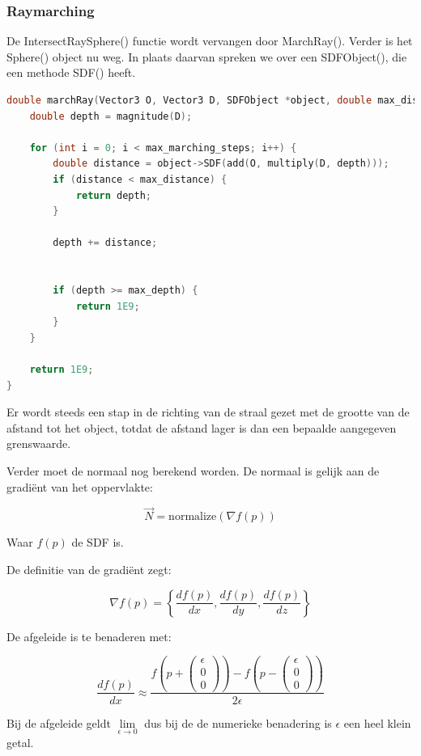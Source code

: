 \documentclass[12pt, a4paper]{article}
\newcommand*{\ora}{\overrightarrow}
\begin{document}
\subsubsection{Raymarching}

De IntersectRaySphere() functie wordt vervangen door MarchRay(). Verder is het Sphere() object nu weg. In plaats daarvan spreken we over een SDFObject(), die een methode SDF() heeft.

\begin{lstlisting}[language=C++]
double marchRay(Vector3 O, Vector3 D, SDFObject *object, double max_distance, int max_marching_steps, double max_depth) {
    double depth = magnitude(D);

    for (int i = 0; i < max_marching_steps; i++) {
        double distance = object->SDF(add(O, multiply(D, depth)));
        if (distance < max_distance) {
            return depth;
        }

        depth += distance;


        if (depth >= max_depth) {
            return 1E9;
        }
    }

    return 1E9;
}
\end{lstlisting}

Er wordt steeds een stap in de richting van de straal gezet met de grootte van de afstand tot het object, totdat de afstand lager is dan een bepaalde aangegeven grenswaarde.

Verder moet de normaal nog berekend worden. De normaal is gelijk aan de gradiënt van het oppervlakte:

\[\ora{N} = \text{normalize}(\nabla f(p))\]

Waar $f(p)$ de SDF is.

De definitie van de gradiënt zegt:

\[\nabla f(p)=\left\{\frac{df(p)}{dx},\frac{df(p)}{dy},\frac{df(p)}{dz}\right\}\]

De afgeleide is te benaderen met:

\[\frac{df(p)}{dx}\approx\frac{f\left(p+\begin{pmatrix} \epsilon \\ 0 \\ 0 \end{pmatrix}\right)-f\left(p-\begin{pmatrix} \epsilon \\ 0 \\ 0 \end{pmatrix}\right)}{2\epsilon}\]

Bij de afgeleide geldt $\lim\limits_{\epsilon \to 0}$ dus bij de de numerieke benadering is $\epsilon$ een heel klein getal.
\end{document}
